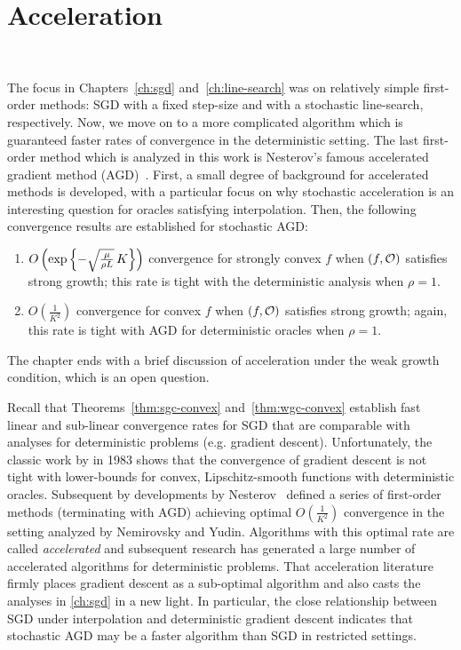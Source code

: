 
\chapter{Acceleration}~\label{ch:acceleration}

The focus in Chapters~\ref{ch:sgd} and~\ref{ch:line-search} was on relatively simple first-order methods: SGD with a fixed step-size and with a stochastic line-search, respectively.
Now, we move on to a more complicated algorithm which is guaranteed faster rates of convergence in the deterministic setting.
The last first-order method which is analyzed in this work is Nesterov's famous accelerated gradient method (AGD)~\cite[Eq. 2.2.20]{nesterov2004lectures}.
First, a small degree of background for accelerated methods is developed, with a particular focus on why stochastic acceleration is an interesting question for oracles satisfying interpolation.
Then, the following convergence results are established for stochastic AGD:
\begin{enumerate}
    \item \( O\rbr{\exp\cbr{- \sqrt{\frac{\mu}{\rho L}} \, K}} \) convergence for strongly convex \( f \) when \( \rbr{f, \oracle{}} \) satisfies strong growth; this rate is tight with the deterministic analysis when \( \rho = 1 \).
    \item \( O(\frac{1}{K^2}) \)  convergence for convex \( f \) when \( \rbr{f, \oracle{}} \) satisfies strong growth; again, this rate is tight with AGD for deterministic oracles when \( \rho = 1 \).
\end{enumerate}
The chapter ends with a brief discussion of acceleration under the weak growth condition, which is an open question.

Recall that Theorems~\ref{thm:sgc-convex} and~\ref{thm:wgc-convex} establish fast linear and sub-linear convergence rates for SGD that are comparable with analyses for deterministic problems (e.g. gradient descent).
Unfortunately, the classic work by \citet{nemirovsky1983problem} in 1983 shows that the convergence of gradient descent is not tight with lower-bounds for convex, Lipschitz-smooth functions with deterministic oracles. 
Subsequent by developments by Nesterov~\citep{nesterov1983method, nemirovskii1985optimal, nesterov1988approach} defined a series of first-order methods (terminating with AGD) achieving optimal \( O(\frac{1}{K^2}) \) convergence in the setting analyzed by Nemirovsky and Yudin. 
Algorithms with this optimal rate are called \emph{accelerated} and subsequent research has generated a large number of accelerated algorithms for deterministic problems.
That acceleration literature firmly places gradient descent as a sub-optimal algorithm and also casts the analyses in \autoref{ch:sgd} in a new light.
In particular, the close relationship between SGD under interpolation and deterministic gradient descent indicates that stochastic AGD may be a faster algorithm than SGD in restricted settings. 

